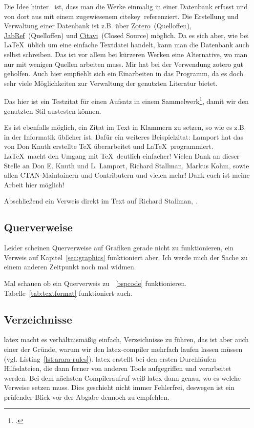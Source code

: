 Die Idee hinter \ ist, dass man die Werke einmalig in einer Datenbank erfasst und von dort aus mit einem zugewiesenem \glqq citekey\grqq\ referenziert. Die Erstellung und Verwaltung einer Datenbank ist z.B. über \href{https://www.zotero.org/}{Zotero}\ (Quelloffen), \href{https://www.jabref.org/}{JabRef}\ (Quelloffen) und \href{https://www.citavi.com/}{Citavi}\ (Closed Source) möglich. Da es sich aber, wie bei \LaTeX{}\ üblich um eine einfache Textdatei handelt, kann man die Datenbank auch selbst
schreiben. Das ist vor allem bei kürzeren Werken eine Alternative, wo man nur mit wenigen Quellen arbeiten muss.
Mir hat bei der Verwendung zotero gut geholfen. Auch hier empfiehlt sich ein Einarbeiten in das Programm, da es doch sehr viele Möglichkeiten zur Verwaltung der genutzten Literatur bietet.

Das hier ist ein Testzitat für einen Aufsatz in einem Sammelwerk\footcite[][]{billen_kundenbindung_2005}, damit wir den genutzten Stil austesten können.

Es ist ebenfalls möglich, ein Zitat im Text in Klammern zu setzen, so wie es z.B. in der Informatik üblicher ist. Dafür ein weiteres Beispielzitat: Lamport \parencite[Siehe][]{lamport_latex_1994} hat das von Don Knuth \parencite[Siehe][]{knuth_tex_1979} erstellte \TeX{} überarbeitet und \LaTeX{}\ programmiert. \LaTeX{}\ macht den Umgang mit \TeX{}\ deutlich einfacher! Vielen Dank an dieser Stelle an Don E. Knuth und L. Lamport, Richard Stallman, Markus Kohm, sowie allen CTAN-Maintainern und Contributern und vielen mehr! Dank euch ist meine Arbeit hier möglich!

Abschließend ein Verweis direkt im Text auf Richard Stallman, \cite[siehe ][S. 6 -- 18]{dibona_open_1999}.
\subsection{Querverweise}%
\label{sec:refs}
Leider scheinen Querverweise auf Grafiken gerade nicht zu funktionieren, ein Verweis auf Kapitel~\ref{sec:graphics} funktioniert aber. Ich werde mich der Sache zu einem anderen Zeitpunkt noch mal widmen.

Mal schauen ob ein Querverweis zu ~\ref{bspcode} funktionieren. Tabelle~\ref{tab:textformat} funktioniert auch.
\subsection{Verzeichnisse}%
\label{sec:catalogs}
\gls{latex} macht es verhältnismäßig einfach, Verzeichnisse zu führen, das ist aber auch einer der Gründe, warum wir den \gls{latex}-\gls{compiler} mehrfach laufen lassen müssen (vgl. Listing~\ref{lst:arara-rules}). \gls{latex} erstellt bei den ersten Durchläufen Hilfsdateien, die dann ferner von anderen Tools aufgegriffen und verarbeitet werden. Bei dem nächsten Compileraufruf weiß \gls{latex} dann genau, wo es welche Verweise setzen muss. Dies geschieht nicht immer Fehlerfrei, deswegen ist ein prüfender Blick vor der Abgabe dennoch zu empfehlen.

